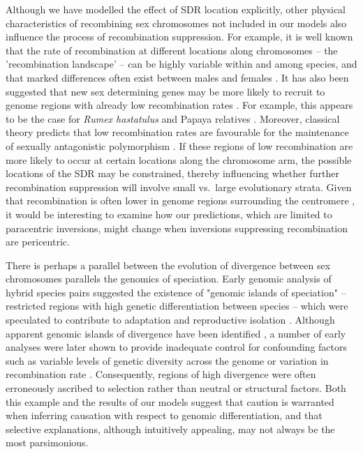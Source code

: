\documentclass{article}
\begin{document}
Although we have modelled the effect of SDR location explicitly, other physical characteristics of recombining sex chromosomes not included in our models also influence the process of recombination suppression. For example, it is well known that the rate of recombination at different locations along chromosomes -- the 'recombination landscape' -- can be highly variable within and among species, and that marked differences often exist between males and females \citep[reviewed in ][]{SinghalEtAl2015,SardellKirkpatrick2020}. It has also been suggested that new sex determining genes may be more likely to recruit to genome regions with already low recombination rates \citep{Charlesworth1978a,vanDoornKirkpatrick2007, vanDoornKirkpatrick2010, OttoScottOsmond2018, Charlesworth2015, Olito2019}. For example, this appears to be the case for {\itshape Rumex hastatulus} and Papaya relatives \citep{RifkinBarrettWright2020,Lovene2015}. Moreover, classical theory predicts that low recombination rates are favourable for the maintenance of sexually antagonistic polymorphism \citep{Charlesworth1978a,Olito2017,Olito2019,Charlesworth2018}. If these regions of low recombination are more likely to occur at certain locations along the chromosome arm, the possible locations of the SDR may be constrained, thereby influencing whether further recombination suppression will involve small vs.~large evolutionary strata. Given that recombination is often lower in genome regions surrounding the centromere \citep[e.g.,][]{MahtaniWillard1998,SardellKirkpatrick2020}, it would be interesting to examine how our predictions, which are limited to paracentric inversions, might change when inversions suppressing recombination are pericentric.

There is perhaps a parallel between the evolution of divergence between sex chromosomes parallels the genomics of speciation. Early genomic analysis of hybrid species pairs suggested the existence of "genomic islands of speciation" -- restricted regions with high genetic differentiation between species -- which were speculated to contribute to adaptation and reproductive isolation \citep[e.g.,][]{Ellegren2012}. Although apparent genomic islands of divergence have been identified \citep{TavaresEtAl2018}, a number of early analyses were later shown to provide inadequate control for confounding factors such as variable levels of genetic diversity across the genome or variation in recombination rate \citep{NoorBennett2009, WolfEllegren2017}. Consequently, regions of high divergence were often erroneously ascribed to selection rather than neutral or structural factors. Both this example and the results of our models suggest that caution is warranted when inferring causation with respect to genomic differentiation, and that selective explanations, although intuitively appealing, may not always be the most parsimonious.
\end{document}
